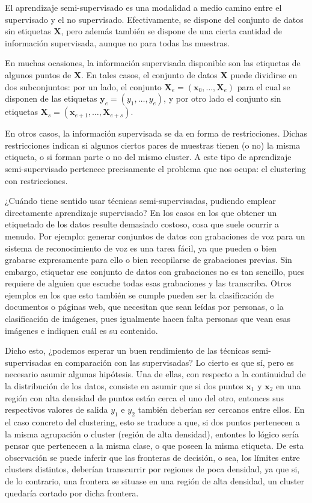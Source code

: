 El aprendizaje semi-supervisado es una modalidad a medio camino entre el supervisado y el no supervisado. Efectivamente, se dispone del conjunto de datos sin etiquetas $\textbf{X}$, pero además también se dispone de una cierta cantidad de información supervisada, aunque no para todas las muestras.

En muchas ocasiones, la información supervisada disponible son las etiquetas de algunos puntos de $\textbf{X}$. En tales casos, el conjunto de datos $\textbf{X}$ puede dividirse en dos subconjuntos: por un lado, el conjunto $\textbf{X}_e = (\textbf{x}_0,\dots,\textbf{X}_e)$ para el cual se disponen de las etiquetas $\textbf{y}_e = (y_1,\dots,y_e)$, y por otro lado el conjunto sin etiquetas $\textbf{X}_s = (\textbf{x}_{e+1},\dots,\textbf{X}_{e+s})$.

En otros casos, la información supervisada se da en forma de restricciones. Dichas restricciones indican si algunos ciertos pares de muestras tienen (o no) la misma etiqueta, o si forman parte o no del mismo cluster. A este tipo de aprendizaje semi-supervisado pertenece precisamente el problema que nos ocupa: el clustering con restricciones.

¿Cuándo tiene sentido usar técnicas semi-supervisadas, pudiendo emplear directamente aprendizaje supervisado? En los casos en los que obtener un etiquetado de los datos resulte demasiado costoso, cosa que suele ocurrir a menudo. Por ejemplo: generar conjuntos de datos con grabaciones de voz para un sistema de reconocimiento de voz es una tarea fácil, ya que pueden o bien grabarse expresamente para ello o bien recopilarse de grabaciones previas. Sin embargo, etiquetar ese conjunto de datos con grabaciones no es tan sencillo, pues requiere de alguien que escuche todas esas grabaciones y las transcriba. Otros ejemplos en los que esto también se cumple pueden ser la clasificación de documentos o páginas web, que necesitan que sean leídas por personas, o la clasificación de imágenes, pues igualmente hacen falta personas que vean esas imágenes e indiquen cuál es su contenido.

Dicho esto, ¿podemos esperar un buen rendimiento de las técnicas semi-supervisadas en comparación con las supervisadas? Lo cierto es que sí, pero es necesario asumir algunas hipótesis. Una de ellas, con respecto a la continuidad de la distribución de los datos, consiste en asumir que si dos puntos $\textbf{x}_1$ y $\textbf{x}_2$ en una región con alta densidad de puntos están cerca el uno del otro, entonces sus respectivos valores de salida $y_1$ e $y_2$ también deberían ser cercanos entre ellos. En el caso concreto del clustering, esto se traduce a que, si dos puntos pertenecen a la misma agrupación o cluster (región de alta densidad), entontes lo lógico sería pensar que pertenecen a la misma clase, o que poseen la misma etiqueta. De esta observación se puede inferir que las fronteras de decisión, o sea, los límites entre clusters distintos, deberían transcurrir por regiones de poca densidad, ya que si, de lo contrario, una frontera se situase en una región de alta densidad, un cluster quedaría cortado por dicha frontera. \cite{chapelle2006semi}

